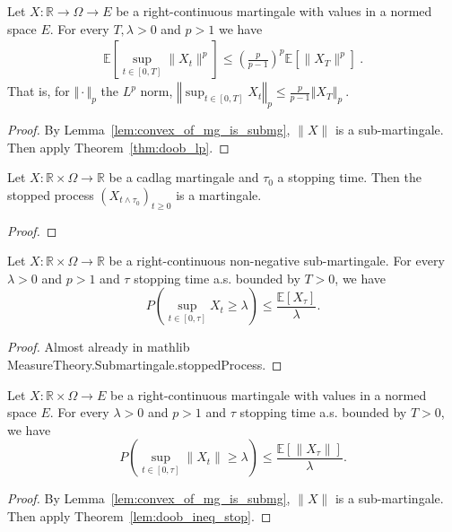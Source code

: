 \begin{corollary}\label{cor:doob_lp_norm}
  Let $X : \mathbb{R} \rightarrow \Omega\rightarrow E$ be a right-continuous martingale with values in a normed space $E$.
  For every $T, \lambda>0$ and $p>1$ we have
  \begin{align*}
    \mathbb{E}\left[ \sup_{t\in[0,T]} \lVert X_t \rVert ^ p \right]
    \leq \left(\frac{p}{p-1}\right)^p\mathbb{E}[\lVert X_T \rVert ^p]
    \: .
  \end{align*}
  That is, for $\Vert \cdot \Vert_p$ the $L^p$ norm,
  $\left\Vert \sup_{t\in[0,T]}  X_t  \right\Vert_p
    \leq \frac{p}{p-1} \left\Vert X_T \right\Vert_p
    \: .$
\end{corollary}

\begin{proof}
  By Lemma~\ref{lem:convex_of_mg_is_submg}, $\lVert X \rVert$ is a sub-martingale.
  Then apply Theorem~\ref{thm:doob_lp}.
\end{proof}


\begin{lemma}\label{lem:stop_of_mg_is_mg}
  Let $X:\mathbb{R}\times\Omega\rightarrow \mathbb{R}$ be a cadlag martingale and $\tau_0$ a stopping time.
  Then the stopped process $(X_{t\wedge\tau_0})_{t\geq 0}$ is a martingale.
\end{lemma}

\begin{proof}

\end{proof}

\begin{lemma}\label{lem:doob_ineq_stop}
  Let $X:\mathbb{R}\times\Omega\rightarrow \mathbb{R}$ be a right-continuous non-negative sub-martingale.
  For every $\lambda>0$ and $p>1$ and $\tau$ stopping time a.s. bounded by $T>0$, we have
  $$
  P\left( \sup_{t\in[0,\tau]}X_t\geq\lambda \right)\leq \frac{\mathbb{E}[X_\tau]}{\lambda}.
  $$
\end{lemma}
\begin{proof}
  Almost already in mathlib MeasureTheory.Submartingale.stoppedProcess.
\end{proof}

\begin{corollary}\label{cor:doob_ineq_stop}
  Let $X:\mathbb{R}\times\Omega\rightarrow E$ be a right-continuous martingale with values in a normed space $E$.
  For every $\lambda>0$ and $p>1$ and $\tau$ stopping time a.s. bounded by $T>0$, we have
  $$
  P\left( \sup_{t\in[0,\tau]}\lVert X_t \rVert \geq\lambda \right)\leq \frac{\mathbb{E}[\lVert X_\tau \rVert]}{\lambda}.
  $$
\end{corollary}
\begin{proof}
  By Lemma~\ref{lem:convex_of_mg_is_submg}, $\lVert X \rVert$ is a sub-martingale.
  Then apply Theorem~\ref{lem:doob_ineq_stop}.
\end{proof}

